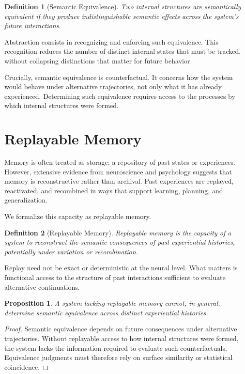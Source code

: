 \documentclass[11pt]{article}
\newtheorem{definition}{Definition}[section]
\newtheorem{proposition}{Proposition}[section]
\begin{document}
\begin{definition}[Semantic Equivalence]
Two internal structures are semantically equivalent if they produce indistinguishable semantic effects across the system's future interactions.
\end{definition}

Abstraction consists in recognizing and enforcing such equivalence. This recognition reduces the number of distinct internal states that must be tracked, without collapsing distinctions that matter for future behavior.

Crucially, semantic equivalence is counterfactual. It concerns how the system would behave under alternative trajectories, not only what it has already experienced. Determining such equivalence requires access to the processes by which internal structures were formed.

\section{Replayable Memory}

Memory is often treated as storage: a repository of past states or experiences. However, extensive evidence from neuroscience and psychology suggests that memory is reconstructive rather than archival. Past experiences are replayed, reactivated, and recombined in ways that support learning, planning, and generalization.

We formalize this capacity as replayable memory.

\begin{definition}[Replayable Memory]
Replayable memory is the capacity of a system to reconstruct the semantic consequences of past experiential histories, potentially under variation or recombination.
\end{definition}

Replay need not be exact or deterministic at the neural level. What matters is functional access to the structure of past interactions sufficient to evaluate alternative continuations.

\begin{proposition}
A system lacking replayable memory cannot, in general, determine semantic equivalence across distinct experiential histories.
\end{proposition}

\begin{proof}
Semantic equivalence depends on future consequences under alternative trajectories. Without replayable access to how internal structures were formed, the system lacks the information required to evaluate such counterfactuals. Equivalence judgments must therefore rely on surface similarity or statistical coincidence.
\end{proof}
\end{document}
